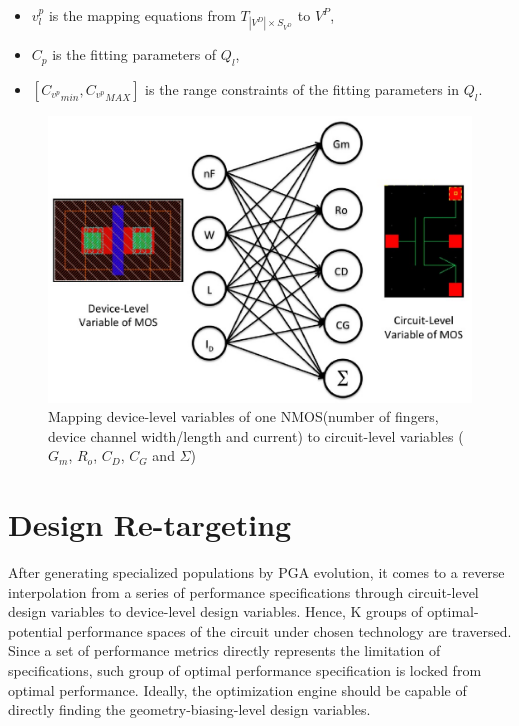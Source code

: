    \begin{itemize}\setlength{\itemsep}{2pt}
      \item $v^p_l$ is the mapping equations from $T_{|V^D|\times S_{V^D}}$ to $V^P$, 
      \item $C_p$ is the fitting parameters of $Q_l$,
      \item $\left [ {C_{v^p}}_{min}, {C_{v^p}}_{MAX}\right]$ is the range constraints of the fitting parameters in $Q_l$.
    \end{itemize}

  
    \begin{figure}[t]
      \centering
      \includegraphics[width=\textwidth]{Fig/DeviceFit.eps}
      \caption{Mapping device-level variables of one NMOS(number of fingers, device channel width/length and current) to circuit-level variables ($G_m$, $R_o$, $C_D$, $C_G$ and $\Sigma$) } 
      \label{fig:DeviceFit}
    \end{figure}

  
  

  \section{Design Re-targeting}\label{sec:reTarg}
    
    After generating specialized populations by PGA evolution, it comes to a reverse interpolation from a series of performance specifications through circuit-level design variables to device-level design variables. Hence, K groups of optimal-potential performance spaces of the circuit under chosen technology are traversed. Since a set of performance metrics directly represents the limitation of specifications, such group of optimal performance specification is locked from optimal performance. Ideally, the optimization engine should be capable of directly finding the geometry-biasing-level design variables. 

